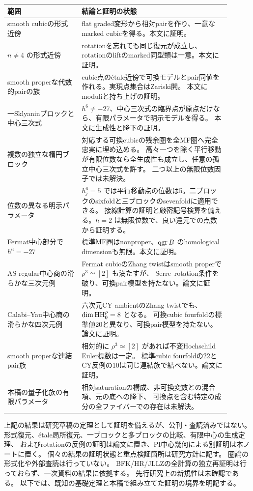 \begin{longtable}{p{0.30\linewidth}p{0.60\linewidth}}
\toprule
範囲 & 結論と証明の状態\\
\midrule
\endhead
smooth cubicの形式近傍 &
flat graded変形から相対pairを作り、一意なmarked cubicを得る。本文に証明。\\
\(n\ne4\) の形式近傍 &
rotationを忘れても同じ復元が成立し、rotationのliftのmarked同型類は一意。本文に証明。\\
smooth properな代数的pairの族 &
cubic点のétale近傍で可換モデルとpair同値を作れる。実現点集合はZariski開。
本文にmoduliと持ち上げの証明。\\
一Sklyaninブロックと中心三次式 &
\(h^6\ne-27\)、中心三次式の臨界点が原点だけなら、有限パラメータで明示モデルを得る。
本文に生成性と降下の証明。\\
複数の独立な楕円ブロック &
対応する可換cubicの残余圏を全MF圏へ完全忠実に埋め込める。
高々一つを除く平行移動が有限位数なら全生成性も成立し、任意の孤立中心三次式を許す。
二つ以上の無限位数因子では未解決。\\
位数の異なる明示パラメータ &
\(h_j^6=5\) では平行移動点の位数は5。二ブロックのsixfoldと三ブロックのsevenfoldに適用できる。
接線計算の証明と厳密記号検算を備える。\(h=2\) は無限位数で、良い還元での点数から証明する。\\
Fermat中心部分で \(h^6=-27\) &
標準MF圏はnonproper、\(\operatorname{qgr} B\) のhomological dimensionも無限。本文に証明。\\
AS-regular中心商の滑らかな三次元例 &
Fermat cubicのZhang twistはsmooth properで \(\rho^3\simeq[2]\) も満たすが、
Serre--rotation条件を破り、可換pair模型を持たない。論文に証明。\\
Calabi--Yau中心商の滑らかな四次元例 &
六次元CY ambientのZhang twistでも、\(\dim\operatorname{HH}_0^{\rho}=8\) となる。
可換cubic fourfoldの標準値20と異なり、可換pair模型を持たない。論文に証明。\\
smooth properな連結pair族 &
相対的に \(\rho^3\simeq[2]\) があれば不変Hochschild Euler標数は一定。
標準cubic fourfoldの22とCY反例の10は同じ連結族で結べない。論文に証明。\\
本稿の量子化族の有限パラメータ &
相対saturationの構成、非可換変数との混合項、元の底への降下、
可換点を含む特定の成分の全ファイバーでの存在は未解決。\\
\bottomrule
\end{longtable}

上記の結果は研究草稿の定理として証明を備えるが、公刊・査読済みではない。
形式復元、étale局所復元、一ブロックと多ブロックの比較、有限中心の生成定理、
およびrotationの反例の証明は論文に置き、PI中心幾何による別証明は本ノートに置く。
個々の結果の証明状態と重点検証箇所は研究方針に記す。
圏論の形式化や外部査読は行っていない。
BFK/HR/JLLZの全計算の独立再証明は行っておらず、一次資料の結果に依拠する。
先行研究上の新規性は未確認である。
以下では、既知の基礎定理と本稿で組み立てた証明の境界を明記する。

